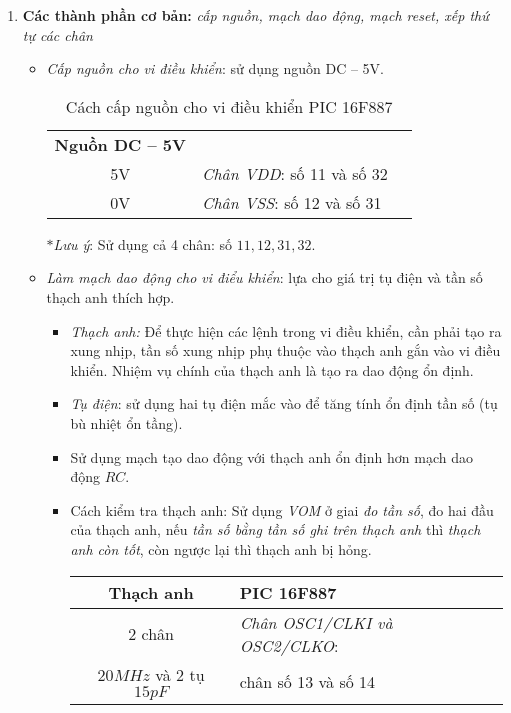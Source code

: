 \begin{enumerate}[{\bf a.}]
\item \textbf{Các thành phần cơ bản:} \textit{cấp nguồn, mạch dao động, mạch reset, xếp thứ tự các chân}
\begin{itemize}
\item \textit{Cấp nguồn cho vi điều khiển}: sử dụng nguồn DC -- 5V.\\
\begin{table}[h]
\begin{center}
\begin{tabular}{|c|p{5cm}|l} \cline{1-2}
\textbf{Nguồn DC -- 5V} & \centering{\textbf{PIC 16F887}} &\\ \cline{1-2}
5V & \textit{Chân VDD}: số 11 và số 32 &\\ \cline{1-2}
0V & \textit{Chân VSS}: số 12 và số 31 &\\ \cline{1-2}
\end{tabular}
\end{center}
\caption{Cách cấp nguồn cho vi điều khiển PIC 16F887} \label{capnguon}
\end{table}
$\ast$\textit{Lưu ý}: Sử dụng cả 4 chân: số $11,12,31,32$.
\item \textit{Làm mạch dao động cho vi điểu khiển}: lựa cho giá trị tụ điện và tần số thạch anh thích hợp.
\begin{itemize}
\item \emph{Thạch anh:} Để thực hiện các lệnh trong vi điều khiển, cần phải tạo ra xung nhịp, tần số xung nhịp phụ thuộc vào thạch anh gắn vào vi điều khiển. Nhiệm vụ chính của thạch anh là tạo ra dao động ổn định.
\item \emph{Tụ điện}: sử dụng hai tụ điện mắc vào để tăng tính ổn định tần số (tụ bù nhiệt ổn tầng).
\item Sử dụng mạch tạo dao động với thạch anh ổn định hơn mạch dao động $RC$.
\item Cách kiểm tra thạch anh: Sử dụng \emph{VOM} ở giai \emph{đo tần số}, đo hai đầu của thạch anh, nếu \emph{tần số bằng tần số ghi trên thạch anh} thì \emph{thạch anh còn tốt}, còn ngược lại thì thạch anh bị hỏng.
\begin{table}[h]
\begin{center}
\begin{tabular}{|c|l|} \hline
\textbf{Thạch anh} & \textbf{PIC 16F887}\\ \hline
2 chân & \textit{Chân OSC1/CLKI và OSC2/CLKO}:\\
$20MHz$ và 2 tụ $15pF$ &  chân số 13 và số 14\\ \hline

\end{tabular}
\end{center}
\end{table}
\end{itemize}
\end{itemize}
\end{enumerate}
